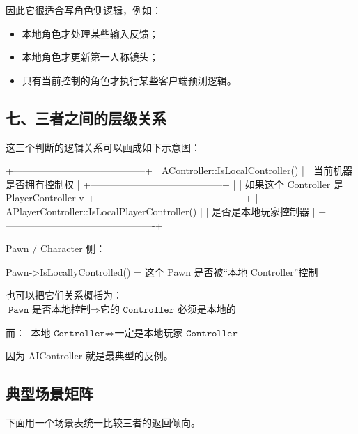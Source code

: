因此它很适合写角色侧逻辑，例如：

\begin{itemize}
	\item 本地角色才处理某些输入反馈；
	\item 本地角色才更新第一人称镜头；
	\item 只有当前控制的角色才执行某些客户端预测逻辑。
\end{itemize}

\subsection{七、三者之间的层级关系}

这三个判断的逻辑关系可以画成如下示意图：

\begin{center}
	\begin{code}
		+-----------------------------------------+
		|   AController::IsLocalController()      |
		|  当前机器是否拥有控制权                    |
		+-----------------------------------------+
		|
		| 如果这个 Controller 是 PlayerController
		v
		+----------------------------------------------+
		| APlayerController::IsLocalPlayerController() |
		| 是否是本地玩家控制器                    |
		+----------------------------------------------+
		
		Pawn / Character 侧：
		
		Pawn->IsLocallyControlled()
		= 这个 Pawn 是否被“本地 Controller”控制
	\end{code}
\end{center}

也可以把它们关系概括为：
$
\texttt{Pawn 是否本地控制}
\Longrightarrow
\texttt{它的 Controller 必须是本地的}
$

而：
$
\texttt{本地 Controller}
\not\Longrightarrow
\texttt{一定是本地玩家 Controller}
$

因为 AIController 就是最典型的反例。

\subsection{典型场景矩阵}

下面用一个场景表统一比较三者的返回倾向。

